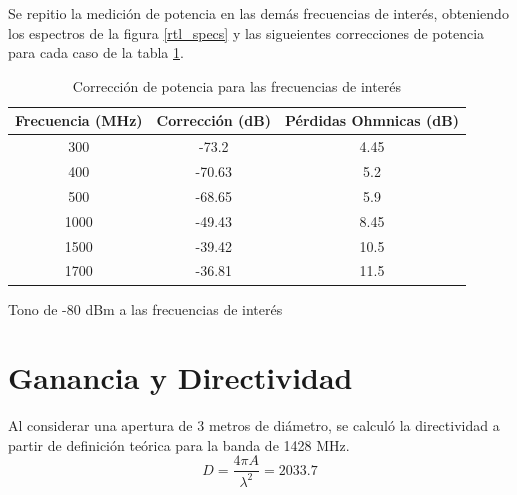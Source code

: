 Se repitio la medición de potencia en las demás frecuencias de interés, obteniendo los espectros de la figura \ref{rtl_specs} y las sigueientes correcciones de potencia para cada caso de la tabla \ref{tab:correccion}.\\

\begin{table}
    \centering
    \begin{tabular}{|c|c|c|}
        \hline
        Frecuencia (MHz) & Corrección (dB) & Pérdidas Ohmnicas (dB)\\
        \hline
        300 & -73.2 & 4.45\\
        400 & -70.63 & 5.2\\
        500 & -68.65 & 5.9\\
        1000 & -49.43 & 8.45\\
        1500 & -39.42 & 10.5\\
        1700 & -36.81 & 11.5\\
        \hline
    \end{tabular}
    \caption{Corrección de potencia para las frecuencias de interés}
    \label{tab:correccion}
\end{table}


\begin{images}{Tono de -80 dBm a las frecuencias de interés}
    

    \imagesnewline


    \imagesnewline


    \label{fig:rtl_specs}
\end{images}

\section{Ganancia y Directividad}

Al considerar una apertura de 3 metros de diámetro, se calculó la directividad a partir de definición teórica para la banda de 1428 MHz.\\

\begin{equation}
    D = \frac{4\pi A}{\lambda^2} = 2033.7
\end{equation}

